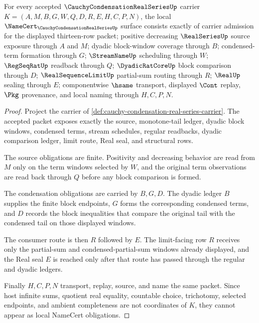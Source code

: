 
\begin{theorem}
\label{thm:cauchy-condensation-real-series-obligations}
For every accepted $\CauchyCondensationRealSeriesUp$ carrier $K=(A,M,B,G,W,Q,D,R,E,H,C,P,N)$, the local $\NameCert_{\CauchyCondensationRealSeriesUp}$ surface consists exactly of carrier admission for the displayed thirteen-row packet; positive decreasing $\RealSeriesUp$ source exposure through $A$ and $M$; dyadic block-window coverage through $B$; condensed-term formation through $G$; $\StreamNameUp$ scheduling through $W$; $\RegSeqRatUp$ readback through $Q$; $\DyadicRatCoreUp$ block comparison through $D$; $\RealSequenceLimitUp$ partial-sum routing through $R$; $\RealUp$ sealing through $E$; componentwise $\hsame$ transport, displayed $\Cont$ replay, $\Pkg$ provenance, and local naming through $H,C,P,N$.
\end{theorem}
\begin{proof}
Project the carrier of \autoref{def:cauchy-condensation-real-series-carrier}. The accepted packet exposes exactly the source, monotone-tail ledger, dyadic block windows, condensed terms, stream schedules, regular readbacks, dyadic comparison ledger, limit route, Real seal, and structural rows.

The source obligations are finite. Positivity and decreasing behavior are read from $M$ only on the term windows selected by $W$, and the original term observations are read back through $Q$ before any block comparison is formed.

The condensation obligations are carried by $B,G,D$. The dyadic ledger $B$ supplies the finite block endpoints, $G$ forms the corresponding condensed terms, and $D$ records the block inequalities that compare the original tail with the condensed tail on those displayed windows.

The consumer route is then $R$ followed by $E$. The limit-facing row $R$ receives only the partial-sum and condensed-partial-sum windows already displayed, and the Real seal $E$ is reached only after that route has passed through the regular and dyadic ledgers.

Finally $H,C,P,N$ transport, replay, source, and name the same packet. Since host infinite sums, quotient real equality, countable choice, trichotomy, selected endpoints, and ambient completeness are not coordinates of $K$, they cannot appear as local NameCert obligations.
\end{proof}

